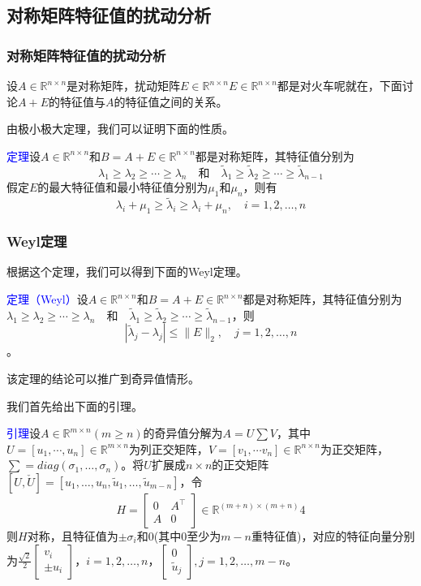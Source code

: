 \documentclass[notheorems,serif]{beamer}
\begin{document}
\subsection*{对称矩阵特征值的扰动分析}
\begin{frame}
\frametitle{对称矩阵特征值的扰动分析}



设$A \in \mathbb{R}^{n \times n}$是对称矩阵，扰动矩阵$E \in \mathbb{R}^{n \times n}$$E \in \mathbb{R}^{n \times n}$都是对火车呢就在，下面讨论$A+E$的特征值与$A$的特征值之间的关系。

由极小极大定理，我们可以证明下面的性质。

\textcolor{blue}{定理}\quad 设$A \in \mathbb{R}^{n \times n}$和$B=A+E \in \mathbb{R}^{n \times n}$都是对称矩阵，其特征值分别为$$
\lambda_{1} \geq \lambda_{2} \geq \cdots \geq \lambda_{n} \quad \text{和}  \quad \tilde{\lambda}_{1} \geq \tilde{\lambda}_{2} \geq \cdots \geq \tilde{\lambda}_{n-1}
$$假定$E$的最大特征值和最小特征值分别为$\mu_{1}$和$\mu_{n}$，则有$$
\lambda_{i}+\mu_{1} \geq \tilde{\lambda}_{i} \geq \lambda_{i}+\mu_{n}, \quad i=1,2, \ldots, n
$$
\end{frame}
\begin{frame}
\frametitle{Weyl定理}


根据这个定理，我们可以得到下面的Weyl定理。

\textcolor{blue}{定理（Weyl）}\quad 设$A \in \mathbb{R}^{n \times n}$和$B=A+E \in \mathbb{R}^{n \times n}$都是对称矩阵，其特征值分别为$
\lambda_{1} \geq \lambda_{2} \geq \cdots \geq \lambda_{n} \quad \text{和}  \quad \tilde{\lambda}_{1} \geq \tilde{\lambda}_{2} \geq \cdots \geq \tilde{\lambda}_{n-1}
$，则$$
\left|\tilde{\lambda}_{j}-\lambda_{j}\right| \leq\|E\|_{2}, \quad j=1,2, \ldots, n
$$。

该定理的结论可以推广到奇异值情形。
\end{frame}
\begin{frame}

我们首先给出下面的引理。

\textcolor{blue}{引理}\quad 设$A \in \mathbb{R}^{m \times n}(m \geq n)$的奇异值分解为$A=U\sum V$，其中$U=[u_1,\cdots ,u_n]\in \mathbb{R}^{m \times n}$为列正交矩阵，$V=[v_1,\cdots v_n]\in \mathbb{R}^{n \times n}$为正交矩阵，$\sum =diag(\sigma_{1}, \ldots, \sigma_{n})$。将$U$扩展成$n\times n$的正交矩阵$[U, \check{U}]=\left[u_{1}, \dots, u_{n}, \tilde{u}_{1}, \ldots, \tilde{u}_{m-n}\right]$，令$$
H=\left[\begin{array}{cc}{0} & {A^{\top}} \\ {A} & {0}\end{array}\right] \in \mathbb{R}^{(m+n) \times(m+n)}
4
$$则$H$对称，且特征值为$\pm \sigma_{i}$和$0$(其中$0$至少为$m-n$重特征值)，对应的特征向量分别为$\frac{\sqrt{2}}{2}\left[\begin{array}{c}{v_{i}} \\ { \pm u_{i}}\end{array}\right]$，$i=1,2, \dots, n$，$\left[\begin{array}{c}{0} \\ {\tilde{u}_{j}}\end{array}\right], j=1,2, \ldots, m-n$。
\end{frame}
\end{document}
